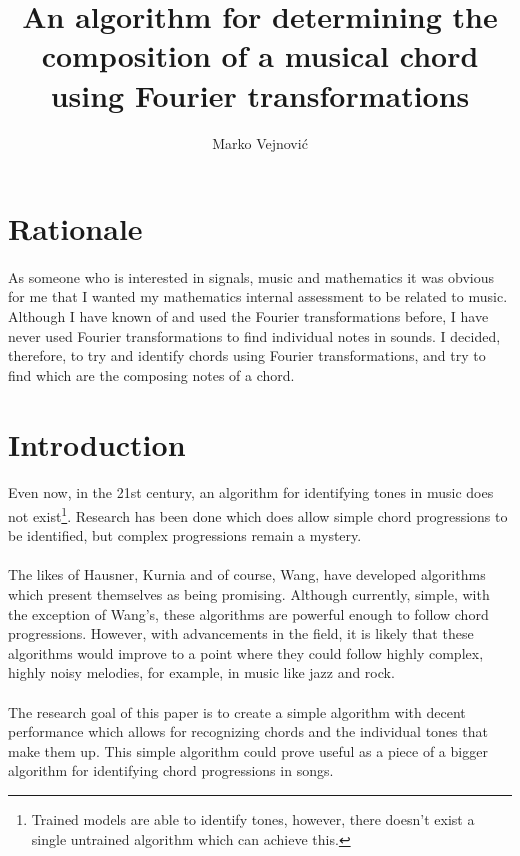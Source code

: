 \documentclass{article}
\title{An algorithm for determining the composition of a musical chord using 
	Fourier transformations}
\author{Marko Vejnovi\'{c}}
\begin{document}
\maketitle

\section{Rationale}
\paragraph*{}
As someone who is interested in signals, music and mathematics it was obvious 
for me that I wanted my mathematics internal assessment to be related to 
music. Although I have known of and used the Fourier transformations before, I 
have never used Fourier transformations to find individual notes in sounds. I 
decided, therefore, to try and identify chords using Fourier transformations, 
and try to find which are the composing notes of a chord.

\section{Introduction}

\paragraph*{}
Even now, in the 21st century, an algorithm for identifying tones in music 
does not exist\footnote{Trained models are able to identify tones, however, 
there doesn't exist a single untrained algorithm which can achieve this.}. 
Research has been done which does allow simple chord progressions to be 
identified, but complex progressions remain a mystery.

\paragraph*{}
The likes of Hausner, Kurnia and of course, Wang, have developed algorithms 
which present themselves as being promising. Although currently, simple, with 
the exception of Wang's, these algorithms are powerful enough to follow chord 
progressions. However, with advancements in the field, it is likely that these 
algorithms would improve to a point where they could follow highly complex, 
highly noisy melodies, for example, in music like jazz and rock.

\paragraph*{}
The research goal of this paper is to create a simple algorithm with decent 
performance which allows for recognizing chords and the individual tones that 
make them up. This simple algorithm could prove useful as a piece of a bigger 
algorithm for identifying chord progressions in songs.
\end{document}

